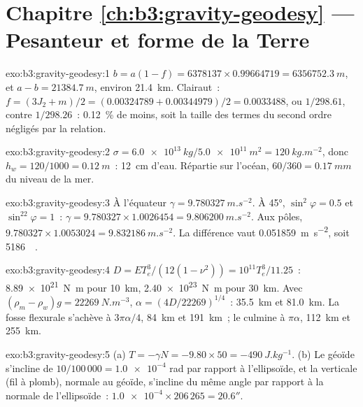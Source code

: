 \section*{Chapitre \ref{ch:b3:gravity-geodesy} --- Pesanteur et forme de la Terre}

\begin{solution}{exo:b3:gravity-geodesy:1}
$b = a(1 - f) = 6378137\times0.99664719 = \qty{6356752.3}{m}$, et
$a - b = \qty{21384.7}{m}$, environ \qty{21.4}{km}. Clairaut~:
$f = (3J_2 + m)/2 = (0.00324789 + 0.00344979)/2 = \num{0.0033488}$, ou
$1/298.61$, contre $1/298.26$~: \qty{0.12}{\percent} de moins, soit la taille des
termes du second ordre négligés par la relation.
\end{solution}

\begin{solution}{exo:b3:gravity-geodesy:2}
$\sigma = \qty{6.0e13}{kg}/\qty{5.0e11}{m^2} = \qty{120}{kg.m^{-2}}$, donc
$h_w = 120/1000 = \qty{0.12}{m}$~: \qty{12}{cm} d'eau. Répartie sur
l'océan, $60/360 = \qty{0.17}{mm}$ du niveau de la mer.
\end{solution}

\begin{solution}{exo:b3:gravity-geodesy:3}
À l'équateur $\gamma = \qty{9.780327}{m.s^{-2}}$. À \ang{45},
$\sin^2\varphi = 0.5$ et $\sin^22\varphi = 1$~: $\gamma = 9.780327\times1.0026454
= \qty{9.806200}{m.s^{-2}}$. Aux pôles, $9.780327\times1.0053024 =
\qty{9.832186}{m.s^{-2}}$. La différence vaut \qty{0.051859}{m.s^{-2}}, soit
\qty{5186}{\milli\gal}.
\end{solution}

\begin{solution}{exo:b3:gravity-geodesy:4}
$D = ET_e^3/(12(1 - \nu^2)) = 10^{11}T_e^3/11.25$~: \qty{8.89e21}{N.m} pour
\qty{10}{km}, \qty{2.40e23}{N.m} pour \qty{30}{km}. Avec $(\rho_m - \rho_w)g =
\qty{22269}{N.m^{-3}}$, $\alpha = (4D/22269)^{1/4}$~: \qty{35.5}{km} et
\qty{81.0}{km}. La fosse flexurale s'achève à $3\pi\alpha/4$, \qty{84}{km} et \qty{191}{km}~;
le  culmine à $\pi\alpha$, \qty{112}{km} et \qty{255}{km}.
\end{solution}

\begin{solution}{exo:b3:gravity-geodesy:5}
(a) $T = -\gamma N = -9.80\times50 = \qty{-490}{J.kg^{-1}}$. (b) Le géoïde s'incline
de $10/100\,000 = \num{1.0e-4}$ rad par rapport à l'ellipsoïde, et la verticale
(fil à plomb), normale au géoïde, s'incline du même angle par rapport à la normale de l'ellipsoïde~:
$\num{1.0e-4}\times206\,265 = 20.6''$.
\end{solution}

